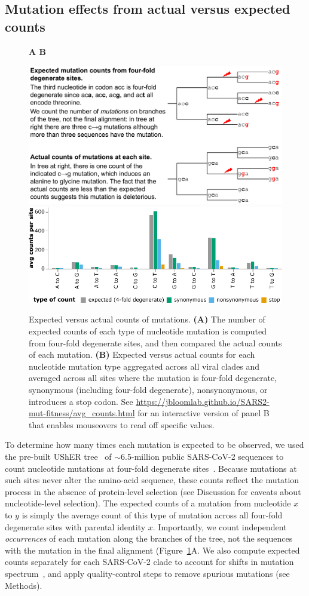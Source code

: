 \documentclass[9pt,twocolumn,twoside]{gsajnl_modified}
\begin{document}
\subsection{Mutation effects from actual versus expected counts}

\begin{figure}
{\bf \Large A \hspace{0.47\linewidth} B}

\includegraphics[width=0.48\linewidth,valign=t]{figs/schematic/schematic.pdf}
\hspace{0.02\linewidth}
\includegraphics[width=0.5\linewidth,valign=t]{figs/avg_counts.pdf}
\caption{
Expected versus actual counts of mutations.
{\bf (A)}
The number of expected counts of each type of nucleotide mutation is computed from four-fold degenerate sites, and then compared the actual counts of each mutation.
{\bf (B)}
Expected versus actual counts for each nucleotide mutation type aggregated across all viral clades and averaged across all sites where the mutation is four-fold degenerate, synonymous (including four-fold degenerate), nonsynonymous, or introduces a stop codon.
See \url{https://jbloomlab.github.io/SARS2-mut-fitness/avg_counts.html} for an interactive version of panel B that enables mouseovers to read off specific values.
\label{fig:expected_vs_actual}
}
\end{figure}

To determine how many times each mutation is expected to be observed, we used the pre-built UShER tree~\citep{mcbroome2021daily,turakhia2021ultrafast,lanfear2020} of $\sim$6.5-million public SARS-CoV-2 sequences to count nucleotide mutations at four-fold degenerate sites~\citep[Figure~\ref{fig:expected_vs_actual}A;][]{bloom2022evolution}.
Because mutations at such sites never alter the amino-acid sequence, these counts reflect the mutation process in the absence of protein-level selection (see Discussion for caveats about nucleotide-level selection).
The expected counts of a mutation from nucleotide $x$ to $y$ is simply the average count of this type of mutation across all four-fold degenerate sites with parental identity $x$.
Importantly, we count independent \emph{occurrences} of each mutation along the branches of the tree, not the sequences with the mutation in the final alignment (Figure~\ref{fig:expected_vs_actual}A.
We also compute expected counts separately for each SARS-CoV-2 clade to account for shifts in mutation spectrum~\citep{bloom2022evolution,ruis2022mutational}, and apply quality-control steps to remove spurious mutations (see Methods).
\end{document}
